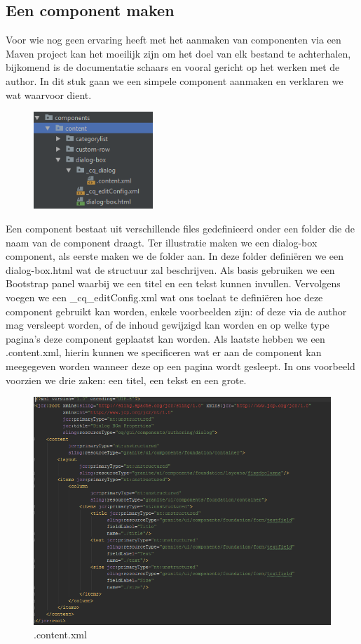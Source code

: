 \documentclass{article}
\begin{document}
	\subsection{Een component maken}
	Voor wie nog geen ervaring heeft met het aanmaken van componenten via een Maven project kan het moeilijk zijn om het doel van elk bestand te achterhalen, bijkomend is de documentatie schaars en vooral gericht op het werken met de author. In dit stuk gaan we een simpele component aanmaken en verklaren we wat waarvoor dient.
	\par
	\begin{figure}
  		\includegraphics[width=0.4\textwidth]{images/component-pck-structure.PNG}
	\end{figure}
	Een component bestaat uit verschillende files gedefinieerd onder een folder die de naam van de component draagt. Ter illustratie maken we een dialog-box component, als eerste maken we de folder aan. In deze folder definiëren we een dialog-box.html wat de structuur zal beschrijven. Als basis gebruiken we een Bootstrap panel waarbij we een titel en een tekst kunnen invullen. Vervolgens voegen we een \_cq\_editConfig.xml wat ons toelaat te definiëren hoe deze component gebruikt kan worden, enkele voorbeelden zijn: of deze via de author mag versleept worden, of de inhoud gewijzigd kan worden en op welke type pagina's deze component geplaatst kan worden. Als laatste hebben we een .content.xml, hierin kunnen we specificeren wat er aan de component kan meegegeven worden wanneer deze op een pagina wordt gesleept. In ons voorbeeld voorzien we drie zaken: een titel, een tekst en een grote.
	\begin{figure}[h!]
  		\includegraphics[width=\linewidth]{images/content-xml.PNG}
  		\caption{.content.xml}
  	\end{figure}
\end{document}
